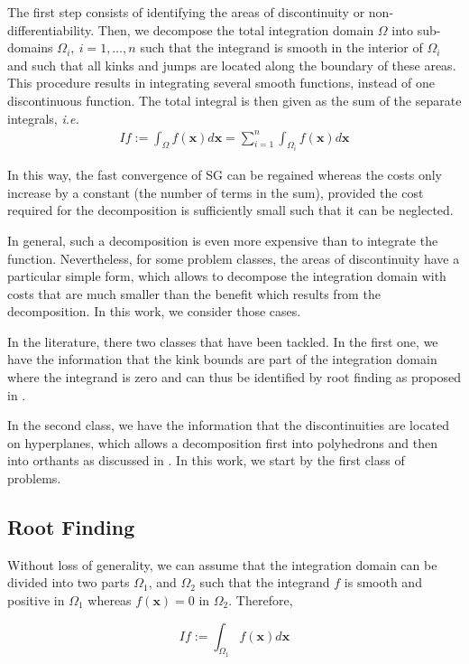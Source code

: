 \documentclass[11pt]{article}
\newcommand{\ie}{\emph{i.e.}}
\begin{document}
The first step consists of identifying the areas 
of discontinuity or non-differentiability. Then, we decompose the total integration domain $\Omega$ into sub-domains $\Omega_i,\: i=1,\dots,n$ such that the
integrand is smooth in the interior of 
$\Omega_i$ and such that all kinks and jumps are
located along the boundary of these areas.  This procedure results in integrating several smooth functions, instead of one discontinuous function. The total integral is then given
as the sum of the separate integrals, \ie
\begin{align}
	I f := \int_{\Omega} f(\mathbf{x}) d \mathbf{x}=\sum_{i=1}^{n}	\int_{\Omega_i} f(\mathbf{x}) d \mathbf{x}
\end{align}

In this way, the fast convergence of SG can
be regained whereas the costs only increase by a constant (the number of terms in
the sum), provided the cost required for the decomposition is sufficiently small such that it can be neglected.




In general, such a decomposition is even more expensive than to integrate the function. Nevertheless, for some problem classes, the areas of discontinuity have a particular simple form, which allows to decompose the integration domain with
costs that are much smaller than the benefit which results from the decomposition.  In this work, we consider those cases.

In the literature, there two classes that have been tackled. In the first one, we have the information that the kink bounds are  part of the integration domain where the integrand is zero and can thus be identified by root finding as proposed in \cite{gerstner2007sparse}.

In the second class, we have the information that the discontinuities are located on hyperplanes, which allows a decomposition first into polyhedrons and then into
orthants as discussed in \cite{gerstner2008valuation}. In this work, we start by the first  class of problems.
\subsection{Root Finding}
Without loss of generality, we can assume that the integration domain  can
be divided into two parts $\Omega_1$, and $\Omega_2$ such that the integrand $f$ is smooth and positive in $\Omega_1$
whereas $f(\mathbf{x}) = 0$ in $\Omega_2$. Therefore,

\begin{equation}
I f := \int_{\Omega_1} f(\mathbf{x}) d \mathbf{x}
\end{equation}
\end{document}
